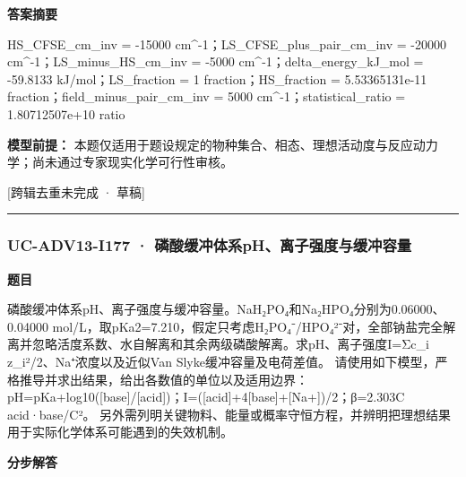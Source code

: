 \documentclass[UTF8,11pt,a4paper]{ctexart}
\begin{document}
\noindent\textbf{答案摘要}\par
HS\_CFSE\_cm\_inv = -15000 cm\textasciicircum{}-1；LS\_CFSE\_plus\_pair\_cm\_inv = -20000 cm\textasciicircum{}-1；LS\_minus\_HS\_cm\_inv = -5000 cm\textasciicircum{}-1；delta\_energy\_kJ\_mol = -59.8133 kJ/mol；LS\_fraction = 1 fraction；HS\_fraction = 5.53365131e-11 fraction；field\_minus\_pair\_cm\_inv = 5000 cm\textasciicircum{}-1；statistical\_ratio = 1.80712507e+10 ratio\par
\noindent\textbf{模型前提：}
本题仅适用于题设规定的物种集合、相态、理想活动度与反应动力学；尚未通过专家现实化学可行性审核。\par
\noindent\textcolor{red!65!black}{[跨辑去重未完成 · 草稿]} \par
\medskip\hrule\medskip
{}
\subsubsection*{UC-ADV13-I177 · 磷酸缓冲体系pH、离子强度与缓冲容量}
\noindent\textbf{题目}\par
磷酸缓冲体系pH、离子强度与缓冲容量。NaH₂PO₄和Na₂HPO₄分别为0.06000、0.04000 mol/L，取pKa2=7.210，假定只考虑H₂PO₄⁻/HPO₄²⁻对，全部钠盐完全解离并忽略活度系数、水自解离和其余两级磷酸解离。求pH、离子强度I=Σc\_i z\_i²/2、Na⁺浓度以及近似Van Slyke缓冲容量及电荷差值。 请使用如下模型，严格推导并求出结果，给出各数值的单位以及适用边界：pH=pKa+log10([base]/[acid])；I=([acid]+4[base]+[Na+])/2；β=2.303C acid·base/C²。 另外需列明关键物料、能量或概率守恒方程，并辨明把理想结果用于实际化学体系可能遇到的失效机制。\par
\medskip\noindent\textbf{分步解答}
\end{document}
